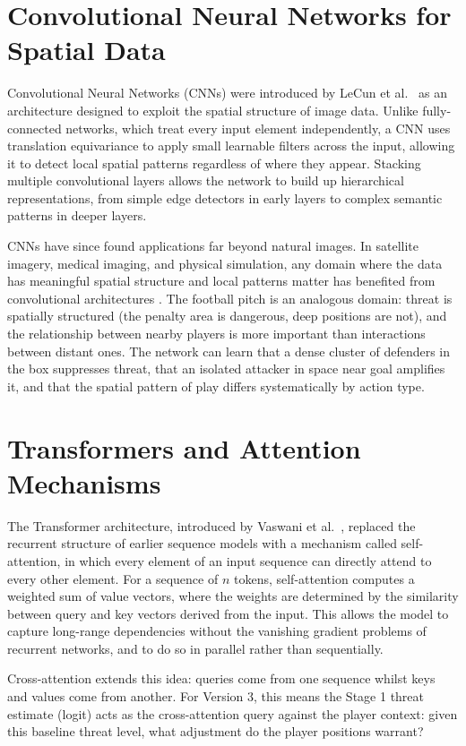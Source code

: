 \section{Convolutional Neural Networks for Spatial Data}

Convolutional Neural Networks (CNNs) were introduced by LeCun et al.~\cite{lecun1998} as an architecture designed to exploit the spatial structure of image data. Unlike fully-connected networks, which treat every input element independently, a CNN uses translation equivariance to apply small learnable filters across the input, allowing it to detect local spatial patterns regardless of where they appear. Stacking multiple convolutional layers allows the network to build up hierarchical representations, from simple edge detectors in early layers to complex semantic patterns in deeper layers.

CNNs have since found applications far beyond natural images. In satellite imagery, medical imaging, and physical simulation, any domain where the data has meaningful spatial structure and local patterns matter has benefited from convolutional architectures \cite{lecun1998}. The football pitch is an analogous domain: threat is spatially structured (the penalty area is dangerous, deep positions are not), and the relationship between nearby players is more important than interactions between distant ones. The network can learn that a dense cluster of defenders in the box suppresses threat, that an isolated attacker in space near goal amplifies it, and that the spatial pattern of play differs systematically by action type.

\section{Transformers and Attention Mechanisms}

The Transformer architecture, introduced by Vaswani et al.~\cite{vaswani2017}, replaced the recurrent structure of earlier sequence models with a mechanism called self-attention, in which every element of an input sequence can directly attend to every other element. For a sequence of $n$ tokens, self-attention computes a weighted sum of value vectors, where the weights are determined by the similarity between query and key vectors derived from the input. This allows the model to capture long-range dependencies without the vanishing gradient problems of recurrent networks, and to do so in parallel rather than sequentially.

Cross-attention extends this idea: queries come from one sequence whilst keys and values come from another. For Version 3, this means the Stage 1 threat estimate (logit) acts as the cross-attention query against the player context: given this baseline threat level, what adjustment do the player positions warrant?

